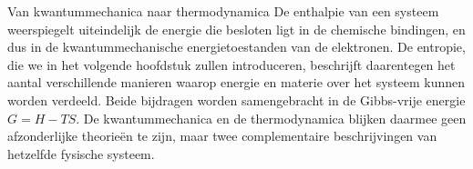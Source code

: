 \begin{besluit}{Van kwantummechanica naar thermodynamica}
De enthalpie van een systeem weerspiegelt uiteindelijk de energie die besloten ligt in de chemische bindingen, en dus in de kwantummechanische energietoestanden van de elektronen. De entropie, die we in het volgende hoofdstuk zullen introduceren, beschrijft daarentegen het aantal verschillende manieren waarop energie en materie over het systeem kunnen worden verdeeld. Beide bijdragen worden samengebracht in de Gibbs-vrije energie $G = H - TS$. De kwantummechanica en de thermodynamica blijken daarmee geen afzonderlijke theorie\"en te zijn, maar twee complementaire beschrijvingen van hetzelfde fysische systeem.
\end{besluit}
